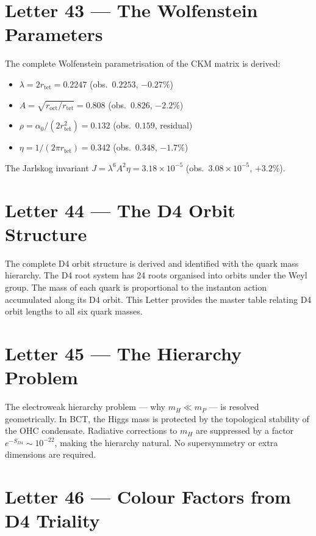 \documentclass[aps,prl,twocolumn,showpacs,preprintnumbers]{revtex4-2}
\newcommand{\roct}{r_{\mathrm{oct}}}
\newcommand{\rtet}{r_{\mathrm{tet}}}
\begin{document}
\section{Letter 43 --- The Wolfenstein Parameters}

\medskip
The complete Wolfenstein parametrisation of the CKM matrix is derived:
\begin{itemize}
  \item $\lambda = 2\rtet = 0.2247$ (obs.\ $0.2253$, $-0.27\%$)
  \item $A = \sqrt{\roct/\rtet} = 0.808$ (obs.\ $0.826$, $-2.2\%$)
  \item $\rho = \alpha_0/(2\rtet^2) = 0.132$ (obs.\ $0.159$, residual)
  \item $\eta = 1/(2\pi\rtet) = 0.342$ (obs.\ $0.348$, $-1.7\%$)
\end{itemize}
The Jarlskog invariant $J = \lambda^6 A^2\eta = 3.18\times10^{-5}$
(obs.\ $3.08\times10^{-5}$, $+3.2\%$).

\section{Letter 44 --- The D4 Orbit Structure}

\medskip
The complete D4 orbit structure is derived and identified with the
quark mass hierarchy. The D4 root system has 24 roots organised into
orbits under the Weyl group. The mass of each quark is proportional
to the instanton action accumulated along its D4 orbit. This Letter
provides the master table relating D4 orbit lengths to all six quark
masses.

\section{Letter 45 --- The Hierarchy Problem}

\medskip
The electroweak hierarchy problem --- why $m_H \ll m_P$ --- is
resolved geometrically. In BCT, the Higgs mass is protected by
the topological stability of the OHC condensate. Radiative corrections
to $m_H$ are suppressed by a factor $e^{-S_{D4}} \sim 10^{-22}$,
making the hierarchy natural. No supersymmetry or extra dimensions
are required.

\section{Letter 46 --- Colour Factors from D4 Triality}
\end{document}

